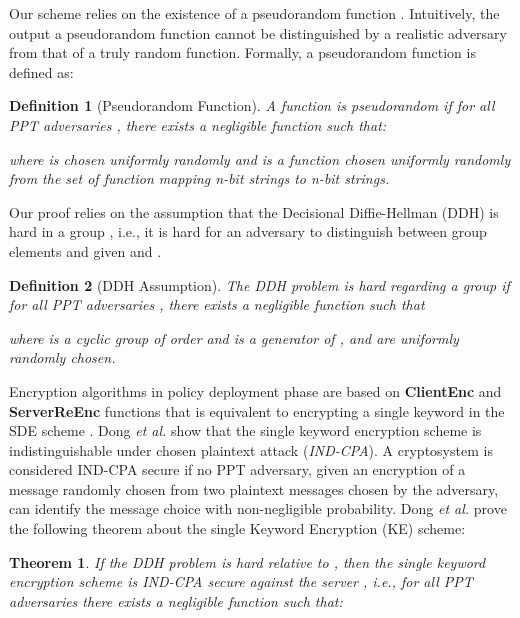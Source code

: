 \documentclass[final,5p,times,twocolumn]{elsarticle}
\newtheorem{definition}{Definition}
\newtheorem{theorem}{Theorem}
\begin{document}
Our scheme relies on the existence of a pseudorandom function . Intuitively, the output a pseudorandom function cannot be distinguished by a realistic adversary from that of a truly random function. Formally, a pseudorandom function is defined as:

\begin{definition}[Pseudorandom Function]
A function  is pseudorandom if for all PPT adversaries , there exists a negligible function  such that:
\begin{center}

\end{center}
where  is chosen uniformly randomly and  is a function chosen uniformly randomly from the set of function mapping n-bit strings to n-bit strings.
\end{definition}

Our proof relies on the assumption that the Decisional Diffie-Hellman (DDH) is hard in a group , i.e., it is hard for an adversary to distinguish between group elements  and   given   and  .

\begin{definition}[DDH Assumption]
The DDH problem is hard regarding a group  if for all PPT adversaries , there
exists a negligible function  such that

where  is a cyclic group of order   and  is a generator of , and  are uniformly randomly chosen.
\end{definition}

Encryption algorithms in policy deployment phase are based on \textbf{ClientEnc} and \textbf{ServerReEnc} functions that is equivalent to encrypting a single keyword in the SDE scheme \cite{Dong2011}. Dong \emph{et al.} \cite{Dong2011} show that the single keyword encryption scheme is indistinguishable under chosen plaintext attack (\textit{IND-CPA}). A cryptosystem is considered IND-CPA secure if no PPT adversary, given an encryption of a message randomly chosen from two plaintext messages chosen by the adversary, can identify the message choice with non-negligible probability. Dong \emph{et al.} \cite{Dong2011} prove the following theorem about the single Keyword Encryption (KE) scheme:


\begin{theorem}
If the DDH problem is hard relative to , then the single keyword encryption
scheme  is IND-CPA secure against the server , i.e., for all PPT adversaries  there exists a negligible function  such that:

\end{theorem}
\end{document}
